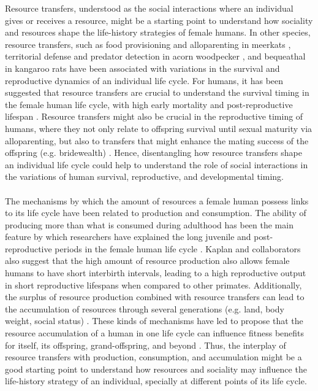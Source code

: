 \documentclass{article}
\begin{document}
Resource transfers, understood as the social interactions where an individual gives or receives a resource, might be a starting point to understand how sociality and resources shape the life-history strategies of female humans. In other species, resource transfers, such as food provisioning and alloparenting in meerkats \citep{clutton2016meerkats}, territorial defense and predator detection in acorn woodpecker \citep{koenig2019does}, and bequeathal in kangaroo rats \citep{jones1986survivorship} have been associated with variations in the survival and reproductive dynamics of an individual life cycle. For humans, it has been suggested that resource transfers are crucial to understand the survival timing in the female human life cycle, with high early mortality and post-reproductive lifespan \citep{lee2003rethinking,lee2008sociality,chu2006co}. Resource transfers might also be crucial in the reproductive timing of humans, where they not only relate to offspring survival until sexual maturity via alloparenting, but also to transfers that might enhance the mating success of the offspring (e.g. bridewealth) \citep{jones2015resource}. Hence, disentangling how resource transfers shape an individual life cycle could help to understand the role of social interactions in the variations of human survival, reproductive, and developmental timing.
\\\\
The mechanisms by which the amount of resources a female human possess links to its life cycle have been related to production and consumption. The ability of producing more than what is consumed during adulthood has been the main feature by which researchers have explained the long juvenile and post-reproductive periods in the female human life cycle \citep{kaplan2000theory}. Kaplan and collaborators also suggest that the high amount of resource production also allows female humans to have short interbirth intervals, leading to a high reproductive output in short reproductive lifespans when compared to other primates. Additionally, the surplus of resource production combined with resource transfers can lead to the accumulation of resources through several generations (e.g. land, body weight, social status) \citep{mulder2009intergenerational}. These kinds of mechanisms have led to propose that the resource accumulation of a human in one life cycle can influence fitness benefits for itself, its offspring, grand-offspring, and beyond \citep{rogers1990evolutionary,boone1999more,goodman2012low}. Thus, the interplay of resource transfers with production, consumption, and accumulation might be a good starting point to understand how resources and sociality may influence the life-history strategy of an individual, specially at different points of its life cycle.
\end{document}
